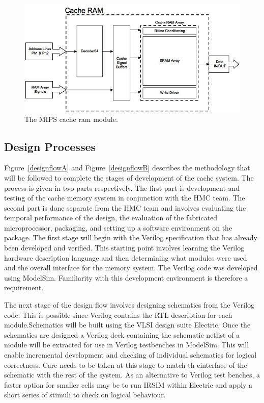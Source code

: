 \begin{figure}
\centering 
\includegraphics[width=\textwidth]{cacheram.jpg}
\caption{The MIPS cache ram module.}
\label{cacheram}
\end{figure}

\subsection{Design Processes}

Figure~\ref{designflowA} and Figure~\ref{designflowB} describes the methodology that will be followed to complete the stages of development of the cache system. The process is given in two parts respectively. The first part is development and testing of the cache memory system in conjunction with the HMC team. The second part is done separate from the HMC team and involves evaluating the temporal performance of the design, the evaluation of the fabricated microprocessor, packaging, and setting up a software environment on the package. The first stage will begin with the Verilog specification that has already been developed and verified. This starting point involves learning the Verilog hardware description language and then determining what modules were used and the overall interface for the memory system. The Verilog code was developed using ModelSim. Familiarity with this development environment is therefore a requirement.

The next stage of the design flow involves designing schematics from the Verilog code. This is possible since Verilog contains the RTL description for each module.Schematics will be built using the VLSI design suite Electric. Once the schematics are designed a Verilog deck containing the schematic netlist of a module will be extracted for use in Verilog testbenches in ModelSim. This will enable incremental development and checking of individual schematics for logical correctness. Care needs to be taken at this stage to match th einterface of the schematic with the rest of the system. As an alternative to Verilog test benches, a faster option for smaller cells may be to run IRSIM within Electric and apply a short series of stimuli to check on logical behaviour.

